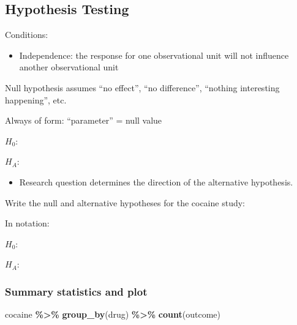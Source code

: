\documentclass[
]{report}
\newenvironment{Shaded}{\begin{snugshade}}{\end{snugshade}}
\newcommand{\FunctionTok}[1]{\textcolor[rgb]{0.13,0.29,0.53}{\textbf{#1}}}
\newcommand{\NormalTok}[1]{#1}
\newcommand{\SpecialCharTok}[1]{\textcolor[rgb]{0.81,0.36,0.00}{\textbf{#1}}}
\providecommand{\tightlist}{%
  \setlength{\itemsep}{0pt}\setlength{\parskip}{0pt}}
\newcommand{\rgi}{\hspace{24pt}}  %
\begin{document}

\newpage

\subsection*{Hypothesis Testing}\label{hypothesis-testing-4}

Conditions:

\begin{itemize}
\tightlist
\item
  Independence: the response for one observational unit will not influence another observational unit
\end{itemize}

Null hypothesis assumes ``no effect'', ``no difference'', ``nothing interesting happening'', etc.

\rgi Always of form: ``parameter'' = null value

\(H_0:\)

\vspace{0.2in}

\(H_A:\)

\vspace{0.2in}

\begin{itemize}
\tightlist
\item
  Research question determines the direction of the alternative hypothesis.
\end{itemize}

Write the null and alternative hypotheses for the cocaine study:

In notation:

\(H_0:\)

\vspace{0.2in}

\(H_A:\)

\vspace{0.2in}

\subsubsection*{Summary statistics and plot}\label{summary-statistics-and-plot}

\begin{Shaded}
\begin{Highlighting}[]
\NormalTok{cocaine }\SpecialCharTok{\%\textgreater{}\%} \FunctionTok{group\_by}\NormalTok{(drug) }\SpecialCharTok{\%\textgreater{}\%} \FunctionTok{count}\NormalTok{(outcome)}
\end{Highlighting}
\end{Shaded}
\end{document}
